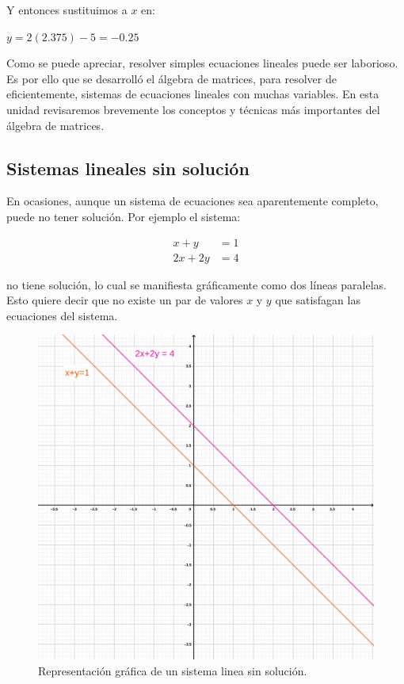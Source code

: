 \documentclass[
]{book}
\begin{document}
Y entonces sustituimos a \(x\) en:

\(y = 2(2.375) - 5 = -0.25\)

Como se puede apreciar, resolver simples ecuaciones lineales puede ser laborioso. Es por ello que se desarrolló el álgebra de matrices, para resolver de eficientemente, sistemas de ecuaciones lineales con muchas variables. En esta unidad revisaremos brevemente los conceptos y técnicas más importantes del álgebra de matrices.

\hypertarget{sistemas-lineales-sin-soluciuxf3n}{%
\subsection{Sistemas lineales sin solución}\label{sistemas-lineales-sin-soluciuxf3n}}

En ocasiones, aunque un sistema de ecuaciones sea aparentemente completo, puede no tener solución. Por ejemplo el sistema:

\begin{align}
x + y & = 1 \\
2x + 2y & = 4
\end{align}

no tiene solución, lo cual se manifiesta gráficamente como dos líneas paralelas. Esto quiere decir que no existe un par de valores \(x\) y \(y\) que satisfagan las ecuaciones del sistema.

\begin{figure}

{\centering \includegraphics[width=41.67in]{Unidad-V/Sistema-no-solucion} 

}

\caption{Representación gráfica de un sistema linea sin solución.}\label{fig:sin-soln}
\end{figure}
\end{document}
